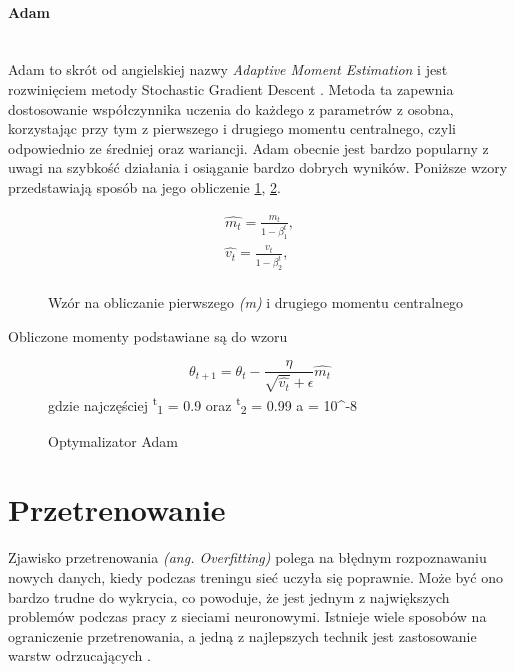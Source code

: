 \paragraph{Adam} \mbox{}\\
Adam to skrót od angielskiej nazwy \textit{Adaptive Moment Estimation} i jest rozwinięciem
metody Stochastic Gradient Descent \cite{AdamOptimizer, OptimizersOverview}.
Metoda ta zapewnia dostosowanie współczynnika uczenia do każdego z parametrów z osobna,
korzystając przy tym z pierwszego i drugiego momentu centralnego, czyli odpowiednio ze
średniej oraz wariancji. Adam obecnie jest bardzo popularny z uwagi na szybkość działania
i osiąganie bardzo dobrych wyników. Poniższe wzory przedstawiają sposób na jego obliczenie \ref{eq:moments_adam}, \ref{eq:adam}.
\begin{figure}[h!]
\renewcommand{\figurename}{Wzór}%
\begin{equation*}
\begin{align*}
\hat{m_t} = \frac{m_t} {1 - \beta^t_1}, \\
\hat{v_t} = \frac{v_t} {1 - \beta^t_2}, \\
\end{align*}
\end{equation*}
\caption{Wzór na obliczanie pierwszego \textit{(m)} i drugiego  momentu centralnego}
\label{eq:moments_adam}
\end{figure}
Obliczone momenty podstawiane są do wzoru
\begin{figure}[h!]
\renewcommand{\figurename}{Wzór}%
\begin{equation*}
\theta_{t+1} = \theta_t - \frac {\eta} {\sqrt{\hat{v_t}} + \epsilon} \hat{m_t}
\end{equation*}
\centering
gdzie najczęściej \textbeta \textsuperscript{t}\textsubscript{1} = 0.9 oraz
\textbeta \textsuperscript{t}\textsubscript{2} = 0.99 a \straightepsilon = 10^{-8}\\
\caption{Optymalizator Adam}
\label{eq:adam}
\end{figure}

\section{Przetrenowanie}
Zjawisko przetrenowania \textit{(ang. Overfitting)} polega na błędnym rozpoznawaniu nowych danych,
kiedy podczas treningu sieć uczyła się poprawnie. Może być ono bardzo trudne do wykrycia,
co powoduje, że jest jednym z największych problemów podczas pracy z sieciami neuronowymi.
Istnieje wiele sposobów na ograniczenie przetrenowania, a jedną z najlepszych technik
jest zastosowanie warstw odrzucających \cite{DropoutPreventOverfit}.

